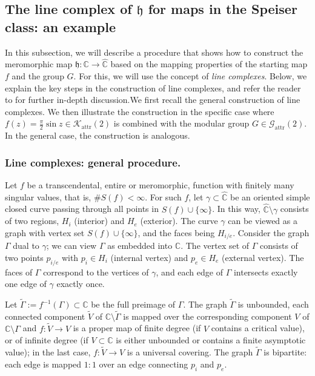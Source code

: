 \documentclass[11pt,a4paper, oneside]{amsart}
\theoremstyle{definition}
\theoremstyle{remark}
\numberwithin{equation}{section}
\def\tG{\widetilde{\Gamma}}
\newcommand{\attr}{{\text{attr}}}
\newcommand{\C}{\mathbb{C}}
\newcommand{\Cc}{\widehat{{\C}}}
\newcommand{\sm}{\setminus}
\begin{document}
\subsection{The line complex of $\mathfrak{h}$ for maps in the Speiser class: an example}\label{speiser_subsec}

In this subsection, we will describe a procedure that shows how to construct the meromorphic map $\mathfrak{h} \colon \C \to \Cc$ based on the mapping properties of the starting map $f$ and the group $G$. For this, we will use the concept of \emph{line complexes}. Below, we explain the key steps in the construction of line complexes, and refer the reader to \cite[Chapter 7]{GO} for further in-depth discussion.{We first recall the general construction of line complexes. We then illustrate the construction in the specific case where $f(z)=\frac{\pi}{2}\sin z \in \mathscr K_{\attr}(2)$ is combined with the modular group $G\in\mathscr G_{\attr}(2)$.} In the general case, the construction is analogous.

\subsubsection{{Line complexes: general procedure.}} Let $f$ be a transcendental, entire or meromorphic, function with finitely many singular values, that is, $\# S(f) < \infty$. For such $f$, let $\gamma \subset \Cc$ be an oriented simple closed curve passing through all points in $S(f) \cup \{\infty\}$. In this way, $\Cc \sm \gamma$ consists of two regions, $H_i$ (interior) and $H_e$ (exterior). The curve $\gamma$ can be viewed as a graph with vertex set $S(f) \cup \{\infty\}$, and the faces being $H_{i/e}$. Consider the graph $\Gamma$ dual to $\gamma$; we can view $\Gamma$ as embedded into $\C$. The vertex set of $\Gamma$ consists of two points $p_{i/e}$ with $p_i \in H_i$ (internal vertex) and $p_e \in H_e$ (external vertex). The faces of $\Gamma$ correspond to the vertices of $\gamma$, and each edge of $\Gamma$ intersects exactly one edge of $\gamma$ exactly once. 

Let $\tG := f^{-1}(\Gamma) \subset \C$ be the full preimage of $\Gamma$. The graph $\tG$ is unbounded, each connected component $\widetilde V$ of $\C \sm \tG$ is mapped over the corresponding component $V$ of $\C \sm \Gamma$ and $f \colon \widetilde V \to V$ is a proper map of finite degree (if $V$ contains a critical value), or of infinite degree (if $V \subset \C$ is either unbounded or contains a finite asymptotic value); in the last case, $f \colon \widetilde V \to V$ is a universal covering. The graph $\tG$ is bipartite: each edge is mapped $1:1$ over an edge connecting $p_i$ and $p_e$. 
\end{document}
